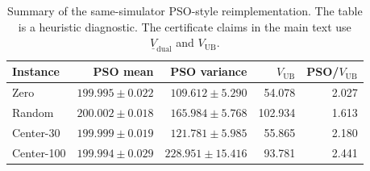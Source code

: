\begin{table}[h]\centering\footnotesize\setlength{\tabcolsep}{5pt}
\caption{Summary of the same-simulator PSO-style reimplementation. The table is
a heuristic diagnostic. The certificate claims in the main text use
$\underline V_{\mathrm{dual}}$ and $V_{\mathrm{UB}}$.}
\label{tab:pso-summary-si}
\begin{tabular}{lrrrr}
\toprule
Instance & PSO mean & PSO variance & $V_{\mathrm{UB}}$ & PSO/$V_{\mathrm{UB}}$\\
\midrule
Zero       & $199.995\pm0.022$ & $109.612\pm5.290$  &  54.078 & 2.027\\
Random     & $200.002\pm0.018$ & $165.984\pm5.768$  & 102.934 & 1.613\\
Center-30  & $199.999\pm0.019$ & $121.781\pm5.985$  &  55.865 & 2.180\\
Center-100 & $199.994\pm0.029$ & $228.951\pm15.416$ &  93.781 & 2.441\\
\bottomrule
\end{tabular}
\end{table}

